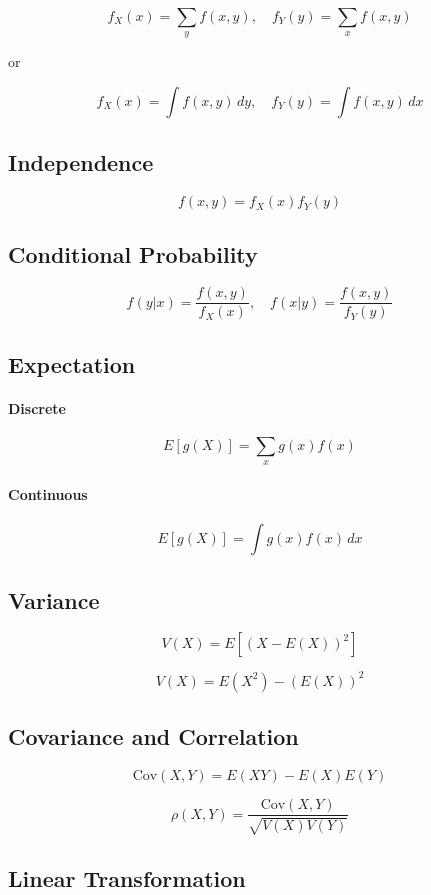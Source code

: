 \[
f_X(x) = \sum_y f(x,y), \quad f_Y(y) = \sum_x f(x,y)
\]

or

\[
f_X(x) = \int f(x,y)\,dy, \quad f_Y(y) = \int f(x,y)\,dx
\]

\subsection{Independence}

\[
f(x,y) = f_X(x) f_Y(y)
\]

\subsection{Conditional Probability}

\[
f(y|x) = \frac{f(x,y)}{f_X(x)}, \quad
f(x|y) = \frac{f(x,y)}{f_Y(y)}
\]

\subsection{Expectation}

\paragraph{Discrete}
\[
E[g(X)] = \sum_x g(x) f(x)
\]

\paragraph{Continuous}
\[
E[g(X)] = \int g(x) f(x)\,dx
\]

\subsection{Variance}

\[
V(X) = E[(X - E(X))^2]
\]

\[
V(X) = E(X^2) - (E(X))^2
\]

\subsection{Covariance and Correlation}

\[
\mathrm{Cov}(X,Y) = E(XY) - E(X)E(Y)
\]

\[
\rho(X,Y) = \frac{\mathrm{Cov}(X,Y)}{\sqrt{V(X)V(Y)}}
\]

\subsection{Linear Transformation}

